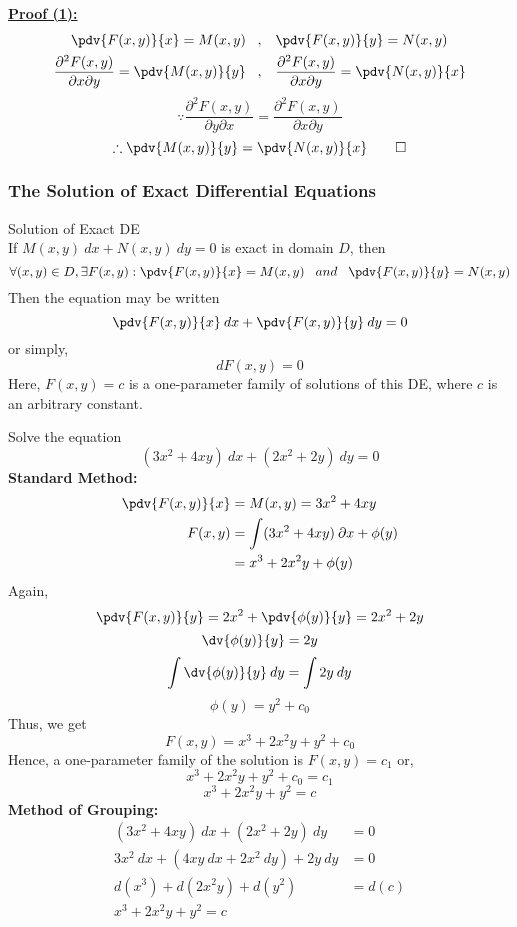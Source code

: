 \underline{\textbf{Proof (1):}}
\begin{align*}
    \pdv{F(x,y)}{x} = M(x,y) \;\;\;&,\;\;\; \pdv{F(x,y)}{y} = N(x,y)  \\
    \frac{\partial^2 F(x,y)}{\partial x \partial y} = \pdv{M(x,y)}{y} \;\;\;&,\;\;\; \frac{\partial^2 F(x,y)}{\partial x \partial y} = \pdv{N(x,y)}{x}
\end{align*}
\[
    \because \frac{\partial^2 F(x,y)}{\partial y \partial x} = \frac{\partial^2 F(x,y)}{\partial x \partial y}
\] \[
    \therefore \pdv{M(x,y)}{y} = \pdv{N(x,y)}{x} \qed
\]

 
\subsubsection{The Solution of Exact Differential Equations}

\begin{theorem}{Solution of Exact DE}{}
    \\If $M(x,y) \: d{x} + N(x,y) \: d{y} = 0$ is exact in domain $D$, then
    \[
        \forall(x,y)\in D, \exists F(x,y) : \pdv{F(x,y)}{x} = M(x,y) \;\;\;and\;\;\;
        \pdv{F(x,y)}{y} = N(x,y)
    \]
    Then the equation may be written \[
        \pdv{F(x,y)}{x} \: d{x} + \pdv{F(x,y)}{y} \: d{y} = 0
    \] or simply, \[
        dF(x,y) = 0
    \]
    Here, $F(x,y) = c$ is a one-parameter family of solutions of this DE, where $c$ is an arbitrary constant.
\end{theorem}

\begin{example}{Solve the equation \[
        (3x^2 + 4xy) \: d{x} + (2x^2 + 2y) \: d{y} = 0
\]}{}
    \textbf{Standard Method:}
    \begin{align*}
        \pdv{F(x,y)}{x} &= M(x,y) = 3x^2 + 4xy \\
        F(x,y) &= \int (3x^2 + 4xy) \: \partial{x} + \phi(y) \\
        &= x^3 + 2x^2y + \phi(y) \\
    \end{align*}
    Again, \[
        \pdv{F(x,y)}{y} = 2x^2 + \pdv{\phi(y)}{y} = 2x^2 + 2y
    \] \[
        \dv{\phi(y)}{y} = 2y
    \] \[
    \int \dv{\phi(y)}{y} \: d{y} = \int 2y \: d{y}
    \] \[
        \phi(y) = y^2 + c_0
    \]
    Thus, we get \[
        F(x,y) = x^3 + 2x^2y + y^2 + c_0
    \] Hence, a one-parameter family of the solution is $F(x,y) = c_1$ or, \[
        x^3 + 2x^2y + y^2 + c_0 = c_1
    \]\[
        \boxed{x^3 + 2x^2y + y^2 = c}
    \]
    \textbf{Method of Grouping:}
    \begin{align*}
        (3x^2 + 4xy) \: d{x} + (2x^2 + 2y) \: d{y} &= 0 \\
        3x^2 \: d{x} + (4xy \: d{x} + 2x^2 \: d{y}) + 2y \: d{y} &= 0 \\
        d(x^3) + d(2x^2y) + d(y^2) &= d(c) \\
        \boxed{x^3 + 2x^2y + y^2 = c}
    \end{align*}
\end{example}

